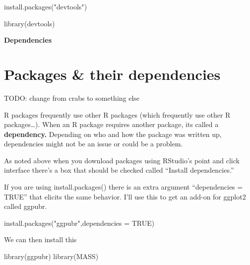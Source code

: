 \documentclass[
]{book}
\newenvironment{Shaded}{\begin{snugshade}}{\end{snugshade}}
\newcommand{\AttributeTok}[1]{\textcolor[rgb]{0.77,0.63,0.00}{#1}}
\newcommand{\ConstantTok}[1]{\textcolor[rgb]{0.00,0.00,0.00}{#1}}
\newcommand{\FunctionTok}[1]{\textcolor[rgb]{0.00,0.00,0.00}{#1}}
\newcommand{\NormalTok}[1]{#1}
\newcommand{\StringTok}[1]{\textcolor[rgb]{0.31,0.60,0.02}{#1}}
\begin{document}
\begin{Shaded}
\begin{Highlighting}[]
\FunctionTok{install.packages}\NormalTok{(}\StringTok{"devtools"}\NormalTok{)}
\end{Highlighting}
\end{Shaded}

\begin{Shaded}
\begin{Highlighting}[]
\FunctionTok{library}\NormalTok{(devtools)}
\end{Highlighting}
\end{Shaded}

\textbf{Dependencies}

\hypertarget{packages-their-dependencies}{%
\chapter{Packages \& their dependencies}\label{packages-their-dependencies}}

TODO: change from crabs to something else

R packages frequently use other R packages (which frequently use other R packages\ldots). When an R package requires another package, its called a \textbf{dependency.} Depending on who and how the package was written up, dependencies might not be an issue or could be a problem.

As noted above when you download packages using RStudio's point and click interface there's a box that should be checked called ``Install dependencies.''

If you are using install.packages() there is an extra argument ``dependencies = TRUE'' that elicits the same behavior. I'll use this to get an add-on for ggplot2 called ggpubr.

\begin{Shaded}
\begin{Highlighting}[]
\FunctionTok{install.packages}\NormalTok{(}\StringTok{"ggpubr"}\NormalTok{,}\AttributeTok{dependencies =} \ConstantTok{TRUE}\NormalTok{)}
\end{Highlighting}
\end{Shaded}

We can then install this

\begin{Shaded}
\begin{Highlighting}[]
\FunctionTok{library}\NormalTok{(ggpubr)}
\FunctionTok{library}\NormalTok{(MASS)}
\end{Highlighting}
\end{Shaded}
\end{document}
